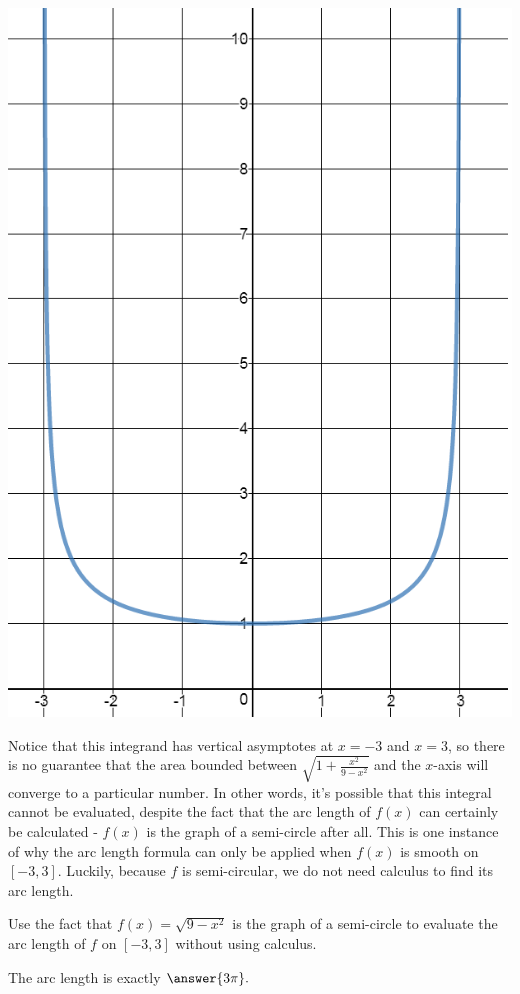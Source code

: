\documentclass[handout,nooutcomes]{ximera}
\begin{document}
\begin{center} \includegraphics{asymptotes.png} \end{center}

Notice that this integrand has vertical asymptotes at $x=-3$ and $x=3$, so there is no guarantee that the area bounded between $\sqrt{1+\frac{x^2}{9-x^2}}$ and the $x$-axis will converge to a particular number.  In other words, it's possible that this integral cannot be evaluated, despite the fact that the arc length of $f(x)$ can certainly be calculated - $f(x)$ is the graph of a semi-circle after all.  This is one instance of why the arc length formula can only be applied when $f(x)$ is smooth on $[-3,3]$.  Luckily, because $f$ is semi-circular, we do not need calculus to find its arc length.

\begin{problem}
Use the fact that $f(x) = \sqrt{9-x^2}$ is the graph of a semi-circle to evaluate the arc length of $f$ on $[-3,3]$ without using calculus.

The arc length is exactly $\answer{3\pi}.$
\end{problem}
\end{document}

